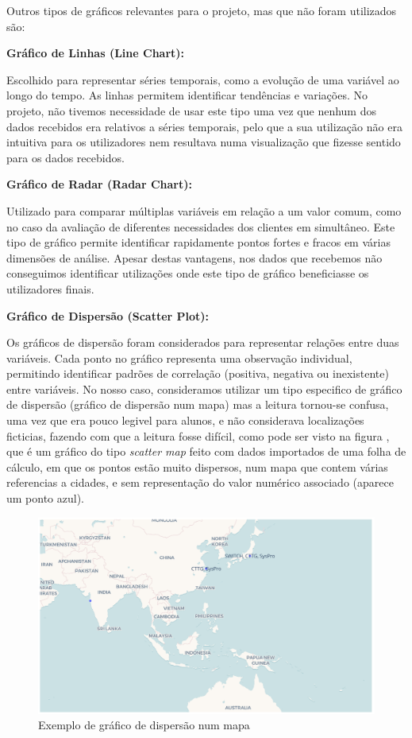 Outros tipos de gráficos relevantes para o projeto, mas que não foram utilizados são:

\textbf{Gráfico de Linhas (Line Chart):}  

Escolhido para representar séries temporais, como a evolução de uma variável ao longo do tempo. As linhas permitem identificar tendências e variações. No projeto, não tivemos necessidade de usar este tipo uma vez que nenhum dos dados recebidos era relativos a séries temporais, pelo que a sua utilização não era intuitiva para os utilizadores nem resultava numa visualização que fizesse sentido para os dados recebidos.

\textbf{Gráfico de Radar (Radar Chart):}  

Utilizado para comparar múltiplas variáveis em relação a um valor comum, como no caso da avaliação de diferentes necessidades dos clientes em simultâneo. Este tipo de gráfico permite identificar rapidamente pontos fortes e fracos em várias dimensões de análise. Apesar destas vantagens, nos dados que recebemos não conseguimos identificar utilizações onde este tipo de gráfico beneficiasse os utilizadores finais.

\textbf{Gráfico de Dispersão (Scatter Plot):}

Os gráficos de dispersão foram considerados para representar relações entre duas variáveis. Cada ponto no gráfico representa uma observação individual, permitindo identificar padrões de correlação (positiva, negativa ou inexistente) entre variáveis. No nosso caso, consideramos utilizar um tipo especifico de gráfico de dispersão (gráfico de dispersão num mapa) mas a leitura tornou-se confusa, uma vez que era pouco legivel para alunos, e não considerava localizações ficticias, fazendo com que a leitura fosse difícil, como pode ser visto na figura  \label{fig:scatter-map}, que é um gráfico do tipo \textit{scatter map} feito com dados importados de uma folha de cálculo, em que os pontos estão muito dispersos, num mapa que contem várias referencias a cidades, e sem representação do valor numérico associado (aparece um ponto azul).

\begin{figure}[H]
    \centering
    \includegraphics[max width=12cm, keepaspectratio]{./img/scatter_map}
    \caption{Exemplo de gráfico de dispersão num mapa}
    \label{fig:scatter-map}
\end{figure}
\noindent

